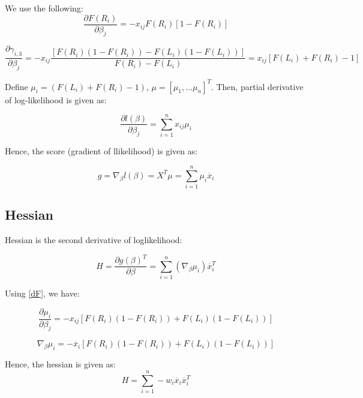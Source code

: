 \documentclass[12pt,a4paper]{report}
\begin{document}
We use the following:
\begin{equation} \label{dF}
\frac{\partial F(R_i)}{\partial \beta_j} =  -x_{ij} F(R_i)[1-F(R_i)]
\end{equation}

\begin{equation}
\frac{\partial \gamma_{i,3}}{\partial \beta_j} = - x_{ij} \frac{ [F(R_i) (1-F(R_i)) - F(L_i)(1-F(L_i))] }{F(R_i) - F(L_i)} = x_{ij} [F(L_i) + F(R_i) - 1]
\end{equation}

Define $\mu_i = (F(L_i) + F(R_i) - 1)$, $\mu = [\mu_1, ... \mu_n]^T$. Then, partial derivative of log-likelihood is given as:

\begin{equation}
\frac{\partial l(\beta)}{\partial \beta_j} = \sum_{i=1}^n x_{ij} \mu_i
\end{equation}

Hence, the score (gradient of llikelihood) is given as:

\begin{equation}
g = \nabla_{\beta} l(\beta) = X^T \mu = \sum_{i=1}^n \mu_i \overline x_i
\end{equation}

\subsection*{Hessian}
Hessian is the second derivative of loglikelihood:

\begin{equation}
H = \frac{ \partial {g(\beta)}^T}{\partial \beta} = \sum_{i=1}^n (\nabla_{\beta} \mu_i) \overline x_i^T
\end{equation}

Using \ref{dF}, we have:

\begin{equation}
\frac{ \partial \mu_i}{\partial \beta_j} = -x_{ij} [F(R_i) (1-F(R_i)) +  F(L_i) (1-F(L_i))]
\end{equation}

\begin{equation}
\nabla_{\beta} \mu_i = -\overline x_i [F(R_i) (1-F(R_i)) + F(L_i) (1-F(L_i))]
\end{equation}

Hence, the hessian is given as:
\begin{equation}
H = \sum_{i=1}^n -w_i \overline x_i \overline x_i^T
\end{equation}
\end{document}
